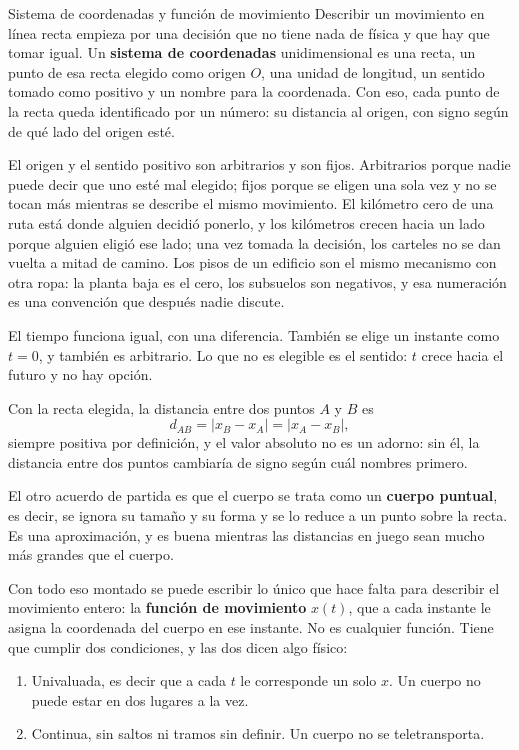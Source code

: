 \documentclass[11pt,openany]{book}
\begin{document}
\begin{bloque}{Sistema de coordenadas y función de movimiento}
Describir un movimiento en línea recta empieza por una decisión que no tiene nada de física y que hay que tomar igual. Un \textbf{sistema de coordenadas} unidimensional es una recta, un punto de esa recta elegido como origen $O$, una unidad de longitud, un sentido tomado como positivo y un nombre para la coordenada. Con eso, cada punto de la recta queda identificado por un número: su distancia al origen, con signo según de qué lado del origen esté.

El origen y el sentido positivo son arbitrarios y son fijos. Arbitrarios porque nadie puede decir que uno esté mal elegido; fijos porque se eligen una sola vez y no se tocan más mientras se describe el mismo movimiento. El kilómetro cero de una ruta está donde alguien decidió ponerlo, y los kilómetros crecen hacia un lado porque alguien eligió ese lado; una vez tomada la decisión, los carteles no se dan vuelta a mitad de camino. Los pisos de un edificio son el mismo mecanismo con otra ropa: la planta baja es el cero, los subsuelos son negativos, y esa numeración es una convención que después nadie discute.

El tiempo funciona igual, con una diferencia. También se elige un instante como $t=0$, y también es arbitrario. Lo que no es elegible es el sentido: $t$ crece hacia el futuro y no hay opción.

Con la recta elegida, la distancia entre dos puntos $A$ y $B$ es
\[
d_{AB} = \lvert x_B - x_A \rvert = \lvert x_A - x_B\rvert,
\]
siempre positiva por definición, y el valor absoluto no es un adorno: sin él, la distancia entre dos puntos cambiaría de signo según cuál nombres primero.

El otro acuerdo de partida es que el cuerpo se trata como un \textbf{cuerpo puntual}, es decir, se ignora su tamaño y su forma y se lo reduce a un punto sobre la recta. Es una aproximación, y es buena mientras las distancias en juego sean mucho más grandes que el cuerpo.

Con todo eso montado se puede escribir lo único que hace falta para describir el movimiento entero: la \textbf{función de movimiento} $x(t)$, que a cada instante le asigna la coordenada del cuerpo en ese instante. No es cualquier función. Tiene que cumplir dos condiciones, y las dos dicen algo físico:
\begin{enumerate}[leftmargin=1.6em, itemsep=2pt, topsep=3pt, label=\arabic*.]
  \item Univaluada, es decir que a cada $t$ le corresponde un solo $x$. Un cuerpo no puede estar en dos lugares a la vez.
  \item Continua, sin saltos ni tramos sin definir. Un cuerpo no se teletransporta.
\end{enumerate}


\end{bloque}
\end{document}
